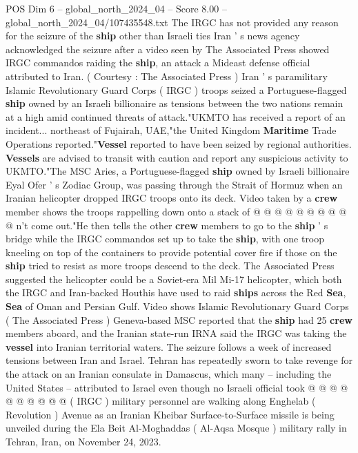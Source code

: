\begin{textsample}{POS Dim 6 – global\_north\_2024\_04 – Score 8.00 – global\_north\_2024\_04/107435548.txt}  \label{ex:f6_pos_117}
The IRGC has not provided any reason for the seizure of the \textbf{ship} other than Israeli ties Iran ' s news agency acknowledged the seizure after a video seen by The Associated Press showed IRGC commandos raiding the \textbf{ship}, an attack a Mideast defense official attributed to Iran. ( Courtesy : The Associated Press ) Iran ' s paramilitary Islamic Revolutionary Guard Corps ( IRGC ) troops seized a Portuguese-flagged \textbf{ship} owned by an Israeli billionaire as tensions between the two nations remain at a high amid continued threats of attack."UKMTO has received a report of an incident... northeast of Fujairah, UAE,"the United Kingdom \textbf{Maritime} Trade Operations reported."\textbf{Vessel} reported to have been seized by regional authorities. \textbf{Vessels} are advised to transit with caution and report any suspicious activity to UKMTO."The MSC Aries, a Portuguese-flagged \textbf{ship} owned by Israeli billionaire Eyal Ofer ' s Zodiac Group, was passing through the Strait of Hormuz when an Iranian helicopter dropped IRGC troops onto its deck.
Video taken by a \textbf{crew} member shows the troops rappelling down onto a stack of @ @ @ @ @ @ @ @ @ @ n't come out."He then tells the other \textbf{crew} members to go to the \textbf{ship} ' s bridge while the IRGC commandos set up to take the \textbf{ship}, with one troop kneeling on top of the containers to provide potential cover fire if those on the \textbf{ship} tried to resist as more troops descend to the deck.
The Associated Press suggested the helicopter could be a Soviet-era Mil Mi-17 helicopter, which both the IRGC and Iran-backed Houthis have used to raid \textbf{ships} across the Red \textbf{Sea}, \textbf{Sea} of Oman and Persian Gulf.
Video shows Islamic Revolutionary Guard Corps ( The Associated Press ) Geneva-based MSC reported that the \textbf{ship} had 25 \textbf{crew} members aboard, and the Iranian state-run IRNA said the IRGC was taking the \textbf{vessel} into Iranian territorial waters.
The seizure follows a week of increased tensions between Iran and Israel.
Tehran has repeatedly sworn to take revenge for the attack on an Iranian consulate in Damascus, which many -- including the United States -- attributed to Israel even though no Israeli official took @ @ @ @ @ @ @ @ @ @ ( IRGC ) military personnel are walking along Enghelab ( Revolution ) Avenue as an Iranian Kheibar Surface-to-Surface missile is being unveiled during the Ela Beit Al-Moghaddas ( Al-Aqsa Mosque ) military rally in Tehran, Iran, on November 24, 2023.

\end{textsample}
